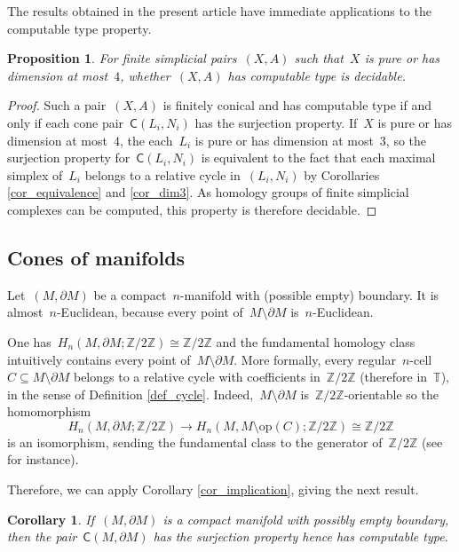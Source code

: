 \documentclass[english,11pt]{article}
\theoremstyle{plain}
\newtheorem{proposition}{Proposition}[section]
\newtheorem{corollary}{Corollary}[section]
\theoremstyle{remark}
\theoremstyle{definition}
\newcommand{\op}[1]{\mathrm{op}(#1)}
\newcommand{\R}{\mathbb{R}}
\newcommand{\Z}{\mathbb{Z}}
\newcommand{\RZ}{\mathbb{T}}%
\newcommand{\C}[1]{\mathsf{C}(#1)}%
\begin{document}
The results obtained in the present article have immediate applications to the computable type property.

\begin{proposition}
For finite simplicial pairs~$(X,A)$ such that~$X$ is pure or has dimension at most~$4$, whether~$(X,A)$ has computable type is decidable.
\end{proposition}
\begin{proof}
Such a pair~$(X,A)$ is finitely conical and has computable type if and only if each cone pair~$\C{L_i,N_i}$ has the surjection property. If~$X$ is pure or has dimension at most~$4$, the each~$L_i$ is pure or has dimension at most~$3$, so the surjection property for~$\C{L_i,N_i}$ is equivalent to the fact that each maximal simplex of~$L_i$ belongs to a relative cycle in~$(L_i,N_i)$ by Corollaries \ref{cor_equivalence} and \ref{cor_dim3}. As homology groups of finite simplicial complexes can be computed, this property is therefore decidable.
\end{proof}

\subsection{Cones of manifolds}

Let~$(M,\partial M)$ be a compact~$n$-manifold with (possible empty) boundary. It is almost~$n$-Euclidean, because every point of~$M\setminus \partial M$ is~$n$-Euclidean.

One has~$H_n(M,\partial M;\Z/2\Z)\cong \Z/2\Z$ and the fundamental homology class intuitively contains every point of~$M\setminus \partial M$. More formally, every regular~$n$-cell~$C\subseteq M\setminus \partial M$ belongs to a relative cycle with coefficients in~$\Z/2\Z$ (therefore in~$\RZ$), in the sense of Definition \ref{def_cycle}. Indeed,~$M\setminus \partial M$ is~$\Z/2\Z$-orientable so the homomorphism
\begin{equation*}
H_n(M,\partial M;\Z/2\Z)\to H_n(M,M\setminus \op{C};\Z/2\Z)\cong \Z/2\Z
\end{equation*}
is an isomorphism, sending the fundamental class to the generator of~$\Z/2\Z$ (see~\cite{Hatcher02} for instance).

Therefore, we can apply Corollary \ref{cor_implication}, giving the next result.
\begin{corollary}\label{cor_cone_manifold}
If~$(M,\partial M)$ is a compact manifold with possibly empty boundary, then the pair~$\C{M,\partial M}$ has the surjection property hence has computable type.
\end{corollary}
\end{document}
